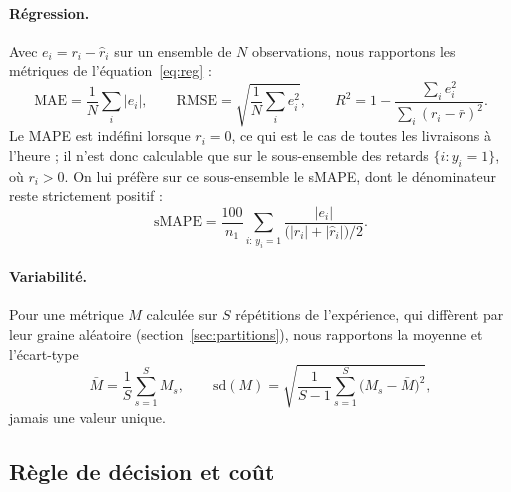 \documentclass[11pt,a4paper]{article}
\theoremstyle{definition}
\begin{document}
\paragraph{Régression.} Avec $e_i = r_i - \hat{r}_i$ sur un ensemble de $N$ observations, nous rapportons les métriques de l'équation~\eqref{eq:reg} :
\begin{equation}
  \mathrm{MAE} = \frac{1}{N}\sum_i |e_i|, \qquad
  \mathrm{RMSE} = \sqrt{\frac{1}{N}\sum_i e_i^{2}}, \qquad
  R^{2} = 1 - \frac{\sum_i e_i^{2}}{\sum_i (r_i-\bar{r})^{2}}.
  \label{eq:reg}
\end{equation}
Le MAPE est indéfini lorsque $r_i = 0$, ce qui est le cas de toutes les livraisons à l'heure ; il n'est donc calculable que sur le sous-ensemble des retards $\{i : y_i = 1\}$, où $r_i > 0$. On lui préfère sur ce sous-ensemble le sMAPE, dont le dénominateur reste strictement positif :
\begin{equation*}
  \mathrm{sMAPE} = \frac{100}{n_1} \sum_{i:\,y_i=1} \frac{|e_i|}{\bigl(|r_i|+|\hat{r}_i|\bigr)/2}.
\end{equation*}

\paragraph{Variabilité.} Pour une métrique $M$ calculée sur $S$ répétitions de l'expérience, qui diffèrent par leur graine aléatoire (section~\ref{sec:partitions}), nous rapportons la moyenne et l'écart-type
\begin{equation*}
  \bar{M} = \frac{1}{S}\sum_{s=1}^{S} M_s, \qquad
  \mathrm{sd}(M) = \sqrt{\frac{1}{S-1}\sum_{s=1}^{S} \bigl(M_s-\bar{M}\bigr)^{2}},
\end{equation*}
jamais une valeur unique.

\subsection{Règle de décision et coût}
\label{sec:decision}
\end{document}
